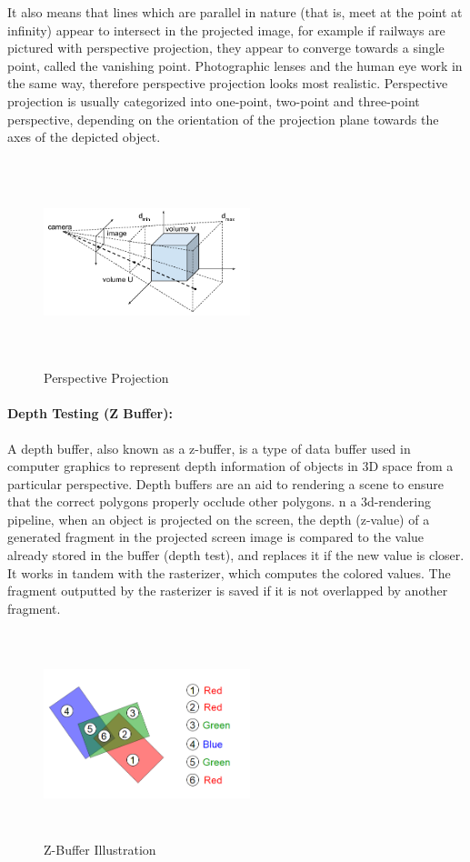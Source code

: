 \documentclass{report}
\begin{document}
    It also means that lines which are parallel in nature (that is, meet at the point at infinity) 
    appear to intersect in the projected image, for example if railways are pictured with perspective 
    projection, they appear to converge towards a single point, called the vanishing point. Photographic 
    lenses and the human eye work in the same way, therefore perspective projection looks most 
    realistic. Perspective projection is usually categorized into one-point, two-point and 
    three-point perspective, depending on the orientation of the projection plane towards the axes of 
    the depicted object.
    \medskip
    \begin{figure}[h!]
      \centering
        \includegraphics[width=6cm,height=6cm,keepaspectratio]{perspective.png}
        \caption{Perspective Projection}
    \end{figure}

    \paragraph{Depth Testing (Z Buffer):}
    A depth buffer, also known as a z-buffer, is a type of data buffer used in computer graphics to 
    represent depth information of objects in 3D space from a particular perspective.\cite{DUMMY:3} Depth buffers are 
    an aid to rendering a scene to ensure that the correct polygons properly occlude other polygons.
    n a 3d-rendering pipeline, when an object is projected on the screen, the depth (z-value) of a generated 
    fragment in the projected screen image is compared to the value already stored in the buffer (depth 
    test), and replaces it if the new value is closer. It works in tandem with the rasterizer, which 
    computes the colored values. The fragment outputted by the rasterizer is saved if it is not overlapped 
    by another fragment. 
    \medskip
    \begin{figure}[h!]
      \centering
        \includegraphics[width=6cm,height=6cm,keepaspectratio]{z-buffer.png}
        \caption{Z-Buffer Illustration}
    \end{figure}
\end{document}
